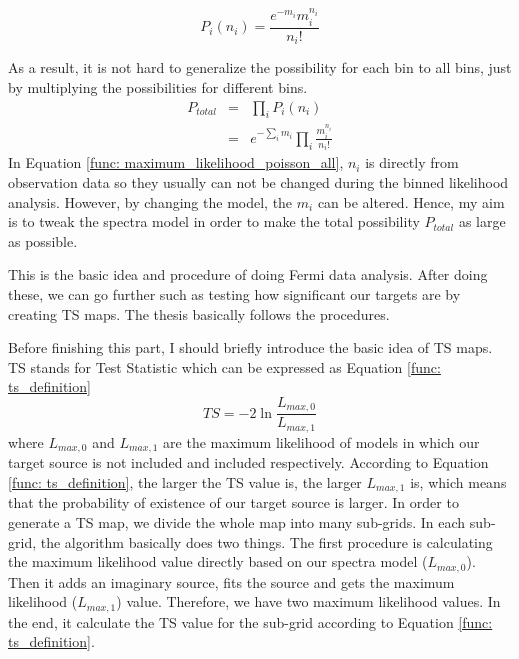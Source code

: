 \documentclass[12pt]{report}
\begin{document}
          \begin{equation}
            P_{i}\left(n_{i}\right) = \frac{e^{-m_{i}} m_{i}^{n_{i}}}{n_{i}!}
            \label{func: maximum_likelihood_poisson}
          \end{equation}

          As a result, it is not hard to generalize the possibility for each bin to all bins, 
          just by multiplying the possibilities for different bins.
          \begin{eqnarray}
            P_{total} &=& \prod_{i}^{}P_{i}\left(n_{i}\right) \nonumber \\ 
                      &=& e^{-\sum_{i}^{}m_i}\prod_{i}^{}\frac{m_{i}^{n_i}}{n_i!}
            \label{func: maximum_likelihood_poisson_all}
          \end{eqnarray}
          In Equation \ref{func: maximum_likelihood_poisson_all}, $n_i$ is directly 
          from observation data so they usually can not be changed during the binned likelihood 
          analysis. However, by changing the model, the $m_i$ can be altered. 
          Hence, my aim is to tweak the spectra model in order to make the total possibility 
          $P_{total}$ as large as possible. 

          This is the basic idea and procedure of doing Fermi data analysis. After doing these,
          we can go further such as testing how significant our targets are by creating TS 
          maps. The thesis basically follows the procedures. 

          Before finishing this part, I should briefly introduce the basic idea of TS maps. 
          TS stands for Test Statistic which can be expressed as Equation \ref{func: ts_definition}
          \begin{equation}
            TS = -2 \ln{\frac{L_{max,0}}{L_{max,1}}}
            \label{func: ts_definition}
          \end{equation}
          where $L_{max,0}$ and $L_{max,1}$ are the maximum likelihood of models in which our 
          target source is not included and included respectively. According to Equation 
          \ref{func: ts_definition}, the larger the TS value is, the larger $L_{max, 1}$ is, 
          which means that the probability of existence of our target source is larger. 
          In order to generate a TS map, we divide the whole map into many sub-grids. In each 
          sub-grid, the algorithm basically does two things. The first procedure is 
          calculating the maximum likelihood value directly based on our spectra model 
          ($L_{max,0}$). Then it adds an imaginary source, fits the source 
          and gets the maximum likelihood ($L_{max, 1}$) value. Therefore, we have two 
          maximum likelihood values. In the end, it calculate the TS value for the 
          sub-grid according to Equation \ref{func: ts_definition}. 
\end{document}
